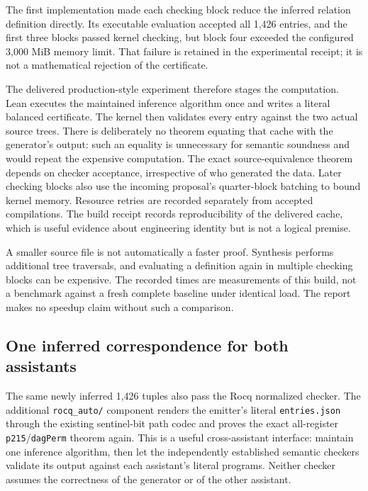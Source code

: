 \documentclass[11pt]{article}
\theoremstyle{definition}\newtheorem{definition}[theorem]{Definition}
\begin{document}
The first implementation made each checking block reduce the inferred relation
definition directly. Its executable evaluation accepted all 1,426 entries, and
the first three blocks passed kernel checking, but block four exceeded the
configured 3,000 MiB memory limit. That failure is retained in the experimental
receipt; it is not a mathematical rejection of the certificate.

The delivered production-style experiment therefore stages the computation.
Lean executes the maintained inference algorithm once and writes a literal
balanced certificate. The kernel then validates every entry against the two
actual source trees. There is deliberately no theorem equating that cache with
the generator's output: such an equality is unnecessary for semantic soundness
and would repeat the expensive computation. The exact source-equivalence
theorem depends on checker acceptance, irrespective of who generated the data.
Later checking blocks also use the incoming proposal's quarter-block batching
to bound kernel memory. Resource retries are recorded separately from accepted
compilations. The build receipt records reproducibility of the delivered cache, which
is useful evidence about engineering identity but is not a logical premise.

A smaller source file is not automatically a faster proof. Synthesis performs
additional tree traversals, and evaluating a definition again in multiple
checking blocks can be expensive. The recorded times are measurements of this
build, not a benchmark against a fresh complete baseline under identical load.
The report makes no speedup claim without such a comparison.

\subsection{One inferred correspondence for both assistants}

The same newly inferred 1,426 tuples also pass the Rocq normalized checker.
The additional \texttt{rocq\_auto/} component renders the emitter's literal
\texttt{entries.json} through the existing sentinel-bit path codec and proves
the exact all-register \texttt{p215}/\texttt{dagPerm} theorem again. This is a
useful cross-assistant interface: maintain one inference algorithm, then let
the independently established semantic checkers validate its output against
each assistant's literal programs. Neither checker assumes the correctness
of the generator or of the other assistant.
\end{document}
